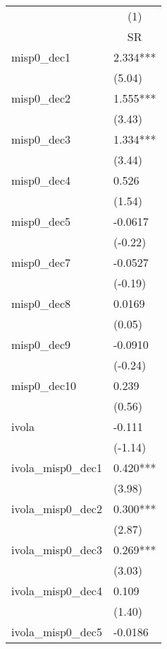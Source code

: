 \begin{tabular}{lc}
\toprule
        & (1) \\
        & SR \\
\midrule
misp0_dec1 & \multicolumn{1}{l}{2.334***} \\
        & \multicolumn{1}{l}{(5.04)} \\
misp0_dec2 & \multicolumn{1}{l}{1.555***} \\
        & \multicolumn{1}{l}{(3.43)} \\
misp0_dec3 & \multicolumn{1}{l}{1.334***} \\
        & \multicolumn{1}{l}{(3.44)} \\
misp0_dec4 & \multicolumn{1}{l}{0.526} \\
        & \multicolumn{1}{l}{(1.54)} \\
misp0_dec5 & \multicolumn{1}{l}{-0.0617} \\
        & \multicolumn{1}{l}{(-0.22)} \\
misp0_dec7 & \multicolumn{1}{l}{-0.0527} \\
        & \multicolumn{1}{l}{(-0.19)} \\
misp0_dec8 & \multicolumn{1}{l}{0.0169} \\
        & \multicolumn{1}{l}{(0.05)} \\
misp0_dec9 & \multicolumn{1}{l}{-0.0910} \\
        & \multicolumn{1}{l}{(-0.24)} \\
misp0_dec10 & \multicolumn{1}{l}{0.239} \\
        & \multicolumn{1}{l}{(0.56)} \\
ivola   & \multicolumn{1}{l}{-0.111} \\
        & \multicolumn{1}{l}{(-1.14)} \\
ivola_misp0_dec1 & \multicolumn{1}{l}{0.420***} \\
        & \multicolumn{1}{l}{(3.98)} \\
ivola_misp0_dec2 & \multicolumn{1}{l}{0.300***} \\
        & \multicolumn{1}{l}{(2.87)} \\
ivola_misp0_dec3 & \multicolumn{1}{l}{0.269***} \\
        & \multicolumn{1}{l}{(3.03)} \\
ivola_misp0_dec4 & \multicolumn{1}{l}{0.109} \\
        & \multicolumn{1}{l}{(1.40)} \\
ivola_misp0_dec5 & \multicolumn{1}{l}{-0.0186} \\

\end{tabular}
